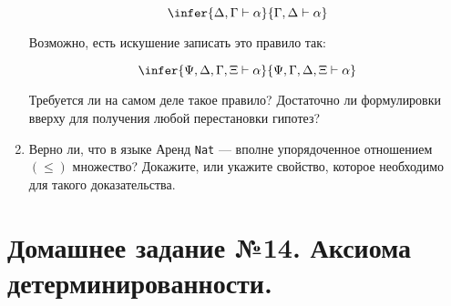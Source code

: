 \documentclass[10pt,a4paper,oneside]{article}
\begin{document}
\begin{enumerate}
$$\infer{\Delta,\Gamma\vdash\alpha}{\Gamma,\Delta\vdash\alpha}$$

Возможно, есть искушение записать это правило так:

$$\infer{\Psi,\Delta,\Gamma,\Xi\vdash\alpha}{\Psi,\Gamma,\Delta,\Xi\vdash\alpha}$$

Требуется ли на самом деле такое правило? Достаточно ли формулировки вверху для получения любой перестановки гипотез?

\item Верно ли, что в языке Аренд \verb!Nat! --- вполне упорядоченное отношением $(\le)$ множество? Докажите, или укажите
свойство, которое необходимо для такого доказательства.
\end{enumerate}

\section*{Домашнее задание №14. Аксиома детерминированности.}
\end{document}
